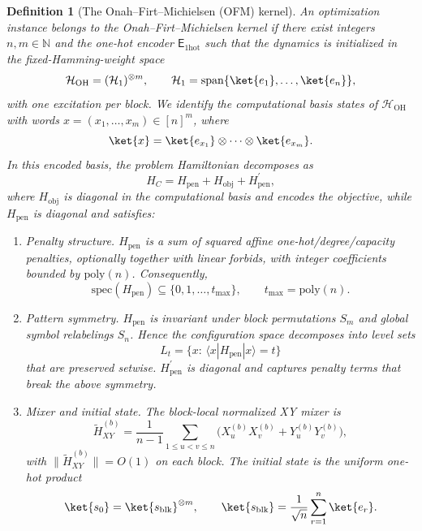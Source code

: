 \documentclass[a4paper,onecolumn,11pt,unpublished]{quantumarticle}
\newtheorem{definition}[theorem]{Definition}
\theoremstyle{remark}
\newcommand{\OH}{\mathcal{H}_{\mathrm{OH}}}
\newcommand{\spec}{\mathrm{spec}}
\begin{document}
\begin{definition}[The Onah--Firt--Michielsen (OFM) kernel\cite{onahce}]
\label{def:kernel-requirement}
An optimization instance belongs to the \emph{ Onah--Firt--Michielsen kernel} if there
exist integers \(n,m\in\mathbb N\) and the one-hot encoder
\(\mathsf E_{\mathrm{1hot}}\) such that the dynamics is initialized in the
fixed-Hamming-weight space
\[
\OH=(\mathcal H_1)^{\otimes m},
\qquad
\mathcal H_1=\mathrm{span}\{\ket{e_1},\dots,\ket{e_n}\},
\]
with one excitation per block. We identify the computational basis states of \(\OH\) with words \(x=(x_1,\dots,x_m)\in[n]^m\), where \[ \ket{x} = \ket{e_{x_1}}\otimes\cdots\otimes\ket{e_{x_m}}. \] In this encoded basis, the problem Hamiltonian decomposes as
\[
H_C=H_{\mathrm{pen}}+H_{\mathrm{obj}} + H^{'}_{\mathrm{pen}},
\]
where \(H_{\mathrm{obj}}\) is diagonal in the computational basis and encodes
the objective, while \(H_{\mathrm{pen}}\) is diagonal and satisfies:
\begin{enumerate}[label=\textup{(\alph*)}, leftmargin=2.2em]
\item \emph{Penalty structure.}
\(H_{\mathrm{pen}}\) is a sum of squared affine one-hot/degree/capacity
penalties, optionally together with linear forbids, with integer coefficients
bounded by \(\mathrm{poly}(n)\). Consequently,
\[
\spec(H_{\mathrm{pen}})\subseteq\{0,1,\dots,t_{\max}\},
\qquad
t_{\max}=\mathrm{poly}(n).
\]

\item \emph{Pattern symmetry.}
\(H_{\mathrm{pen}}\) is invariant under block permutations \(S_m\) and global
symbol relabelings \(S_n\). Hence the configuration space decomposes into level
sets
\[
L_t=\{x:\,\langle x|H_{\mathrm{pen}}|x\rangle=t\}
\]
that are preserved setwise. $H^{'}_{\mathrm{pen}}$ is diagonal and captures penalty terms that break the above symmetry.

\item \emph{Mixer and initial state.}
The block-local normalized XY mixer is
\begin{equation}
\label{eq:mixer}
\widetilde H_{XY}^{(b)}
=
\frac{1}{n-1}\sum_{1\le u<v\le n}
\bigl(X_u^{(b)}X_v^{(b)}+Y_u^{(b)}Y_v^{(b)}\bigr),
\end{equation}
with \(\|\widetilde H_{XY}^{(b)}\|=O(1)\) on each block. The initial state is
the uniform one-hot product
\begin{equation}
\label{eq:initial-state}
\ket{s_0}=\ket{s_{\mathrm{blk}}}^{\otimes m},
\qquad
\ket{s_{\mathrm{blk}}}=\frac{1}{\sqrt n}\sum_{r=1}^{n}\ket{e_r}.
\end{equation}
\end{enumerate}
\end{definition}
\end{document}
